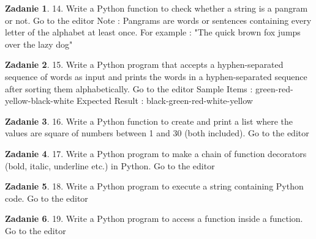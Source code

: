 \documentclass[11pt]{article}
\theoremstyle{definition}
\newtheorem{zadanie}{Zadanie}
\begin{document}
\begin{zadanie}


14. Write a Python function to check whether a string is a pangram or not. Go to the editor
Note : Pangrams are words or sentences containing every letter of the alphabet at least once.
For example : "The quick brown fox jumps over the lazy dog"


\end{zadanie}

\begin{zadanie}


15. Write a Python program that accepts a hyphen-separated sequence of words as input and prints the words in a hyphen-separated sequence after sorting them alphabetically. Go to the editor
Sample Items : green-red-yellow-black-white
Expected Result : black-green-red-white-yellow


\end{zadanie}

\begin{zadanie}


16. Write a Python function to create and print a list where the values are square of numbers between 1 and 30 (both included). Go to the editor


\end{zadanie}

\begin{zadanie}


17. Write a Python program to make a chain of function decorators (bold, italic, underline etc.) in Python. Go to the editor


\end{zadanie}

\begin{zadanie}


18. Write a Python program to execute a string containing Python code. Go to the editor


\end{zadanie}

\begin{zadanie}


19. Write a Python program to access a function inside a function. Go to the editor


\end{zadanie}
\end{document}
